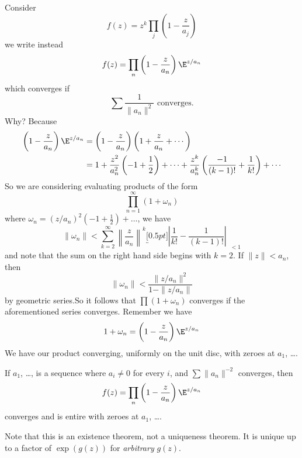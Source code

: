 Consider
\begin{equation}
f(z) = z^{k}\prod_{j}\left(1-\frac{z}{a_{j}}\right)
\end{equation}
we write instead
\begin{equation}
f(z) = \prod_{n}\left(1-\frac{z}{a_{n}}\right)\E^{z/a_{n}}
\end{equation}
which converges if
\begin{equation}
\sum\frac{1}{\|a_{n}\|^{2}}\mbox{ converges}.
\end{equation}
Why? Because
\begin{subequations}
\begin{align}
\left(1-\frac{z}{a_{n}}\right)\E^{z/a_{n}}&=\left(1-\frac{z}{a_{n}}\right)\left(1+\frac{z}{a_{n}}+\cdots\right)\\
&=1+\frac{z^{2}}{a_{n}^{2}}\left(-1+\frac{1}{2}\right)
+\cdots+\frac{z^{k}}{a_{n}^{k}}\left(\frac{-1}{(k-1)!}+\frac{1}{k!}\right)+\cdots
\end{align}
\end{subequations}
So we are considering evaluating products of the form
\begin{equation}
\prod^{\infty}_{n=1}(1+\omega_{n})
\end{equation}
where $\omega_{n}=(z/a_{n})^{2}(-1+\frac{1}{2})+\dots$, we have
\begin{equation}
\|\omega_{n}\|<\sum^{\infty}_{k=2}\left\|\frac{z}{a_{n}}\right\|^{k}\underbracket[0.5pt]{\left|\frac{1}{k!}-\frac{1}{(k-1)!}\right|\;\,}_{<1}
\end{equation}
and note that the sum on the right hand side begins with $k=2$.
If $\|z\|<a_{n}$, then
\begin{equation}
\|\omega_{n}\|<\frac{\|z/a_{n}\|^{2}}{1-\|z/a_{n}\|}
\end{equation}
by geometric series.So it follows that $\prod(1+\omega_{n})$
converges if the aforementioned series converges. Remember we
have
\begin{equation}
1+\omega_{n}=\left(1-\frac{z}{a_{n}}\right)\E^{z/a_{n}}
\end{equation}
We have our product converging, uniformly on the unit disc, with
zeroes at $a_{1}$, \dots.
\begin{thm}
If $a_{1}$, \dots, is a sequence where $a_{i}\not=0$ for every
$i$, and $\sum\|a_{n}\|^{-2}$ converges, then 
\begin{equation}
f(z) = \prod_{n}\left(1-\frac{z}{a_{n}}\right)\E^{z/a_{n}}
\end{equation}
converges and is entire with zeroes at $a_{1}$, \dots.
\end{thm}
Note that this is an existence theorem, not a uniqueness
theorem. It is unique up to a factor of $\exp(g(z))$ for
\emph{arbitrary} $g(z)$.
